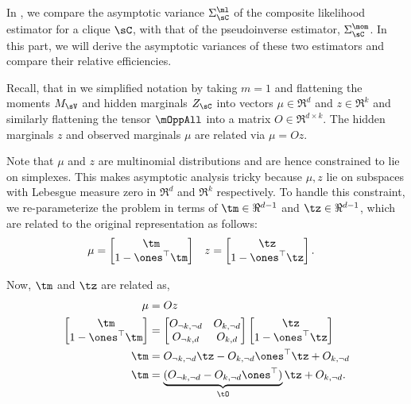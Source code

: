 \subsection{}
\label{app:pw-proof}

In , we compare the asymptotic variance
  $\Sigma^\ml_\sC$ of the composite likelihood estimator for a clique
  $\sC$, with that of the pseudoinverse estimator, $\Sigma^\mom_\sC$. 
In this part, we will derive the asymptotic variances of these two
  estimators and compare their relative efficiencies.

Recall, that in  we simplified notation by taking
  $m=1$ and flattening the moments $M_\sV$ and hidden marginals $Z_\sC$
  into vectors $\mu \in \Re^d$ and $z \in \Re^k$ and similarly
  flattening the tensor $\mOppAll$ into a matrix $O \in \Re^{d\times
  k}$.
The hidden marginals $z$ and observed marginals $\mu$ are related via
  $\mu = O z$.

Note that $\mu$ and $z$ are multinomial distributions and are hence
constrained to lie on simplexes. This makes asymptotic analysis tricky
because $\mu, z$ lie on subspaces with Lebesgue measure zero in $\Re^d$
and $\Re^k$ respectively.
To handle this constraint, we re-parameterize the problem in terms of
  $\tm \in \Re^{d-1}$ and $\tz \in \Re^{d-1}$, 
which are related to the original representation as follows:
\begin{align*}
  \mu &= 
    \begin{bmatrix}
      \tm \\
      1 - \ones^\top\tm
    \end{bmatrix} 
  &
  z &= 
    \begin{bmatrix}
      \tz \\
      1 - \ones^\top\tz
    \end{bmatrix}.
\end{align*}

Now, $\tm$ and $\tz$ are related as,
\begin{align*}
  \mu &= O z \\
  \begin{bmatrix}
    \tm \\
    1 - \ones^\top\tm
  \end{bmatrix} 
  &=
    \begin{bmatrix}
      O_{\neg k,\neg d} & O_{k, \neg d} \\ 
      O_{\neg k,d} & O_{k, d} \\ 
    \end{bmatrix}
    \begin{bmatrix}
      \tz \\
      1 - \ones^\top\tz
    \end{bmatrix} \\
  \tm &= O_{\neg k,\neg d} \tz - O_{k,\neg d} \ones^\top \tz +  O_{k,\neg d} \\
  \tm &= \underbrace{(O_{\neg k,\neg d} - O_{k,\neg d} \ones^\top )}_{\tO} \tz +  O_{k,\neg d}.
\end{align*}

